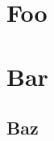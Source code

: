 \documentclass{article}
\begin{document}
\section{Foo}

\section{Bar}\label{sec:bar}

\subsection{Baz}\label{sec:baz}
\end{document}
